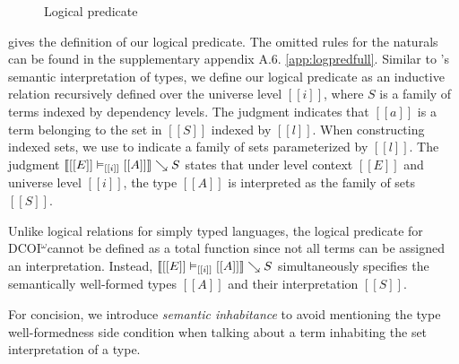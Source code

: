 \documentclass[acmsmall, screen=true, nonacm=true,
  review=\ifpublic false\else true\fi,
  anonymous=\ifanonymous true\else false\fi
]{acmart}
\makeatletter
\DeclarePairedDelimiter{\bracks}{\llbracket}{\rrbracket}
\DeclarePairedDelimiter{\braces}{\lbrace}{\rbrace}
\newcommand{\name}{\texorpdfstring{DCOI$^{\omega}$\@\xspace}{DCOI-omega}}
\newcommand{\judgement}[1]{{\setlength{\fboxsep}{1.5pt}\fbox{#1}}}
\newcommand{\interp}[4]{\bracks{#1 \vDash_{#2} #3} \searrow #4}
\newcommand{\interpU}[3]{\bracks{#1 \vDash_{#2} #3}}
\newcommand{\buildset}[3]{#2 . \braces{#1 \mid #3}}
\newcommand{\member}[3]{#1 \in #3(#2)}
\newcommand{\sigspace}[5]{#1 \in \hat{\Sigma}(#2^{#3}, #4^{#5})}
\makeatother
\begin{document}
\begin{figure}[h]
  \caption{Logical predicate}
  \Description{}
  \label{fig:logpred}
\end{figure}

 gives the definition of our logical
predicate. The omitted rules for the naturals can be
found in
\ifsubmission the supplementary appendix A.6.
\else \cref{app:logpredfull}.
\fi
Similar to \citet{abel:irrelevance}'s semantic interpretation of types, 
we define our logical predicate \judgement{$\interp{[[E]]}{[[i]]}{[[A]]}{S}$}
as an inductive relation recursively defined over the universe level $[[i]]$,
where $S$ is a family of terms indexed by dependency levels. 
The judgment \judgement{$\member{a}{[[l]]}{S}$} indicates that $[[a]]$ is
a term belonging to the set in $[[S]]$ indexed by $[[l]]$.
When constructing indexed sets, we use
\judgement{$\buildset{[[a]]}{[[l]]}{\ldots}$} to indicate a family of sets
parameterized by $[[l]]$.
The judgment $\interp{[[E]]}{[[i]]}{[[A]]}{S}$ states that under
level context $[[E]]$ and universe level $[[i]]$, the type $[[A]]$
is interpreted as the family of sets $[[S]]$.

\ifextended
Unlike logical relations for simply typed languages, the logical
predicate for \name cannot be defined as a total function since not
all terms can be assigned an interpretation. Instead,
\mbox{$\interp{[[E]]}{[[i]]}{[[A]]}{S}$} simultaneously specifies the
semantically well-formed types $[[A]]$ and their interpretation $[[S]]$.
\fi

For concision, we introduce \emph{semantic inhabitance} to
avoid mentioning the type well-formedness side condition
when talking about a term inhabiting the set interpretation of a type.
\end{document}
